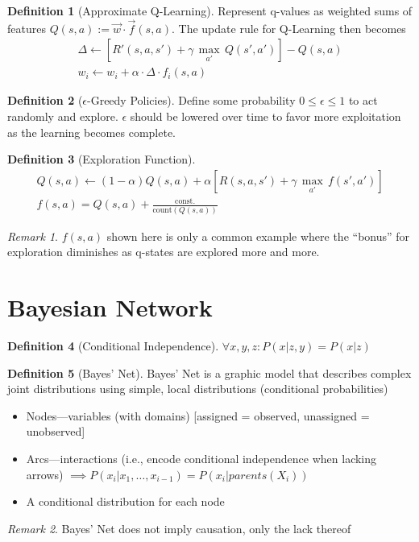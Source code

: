 \documentclass[11pt]{article}
\theoremstyle{definition}
\newtheorem{definition}{Definition}[section]
\theoremstyle{remark}
\newtheorem*{remark}{Remark}
\begin{document}
\begin{definition}[Approximate Q-Learning] Represent q-values as weighted sums of features $Q(s,a) := \vec{w} \cdot \vec{f}(s,a)$. The update rule for Q-Learning then becomes
\begin{align*}
\Delta \gets [R'(s,a,s')+\gamma \, \underset{a'}{\max}\,Q(s',a')]-Q(s,a) \\
w_i \gets w_i + \alpha \cdot \Delta \cdot f_i(s,a)
\end{align*}
\end{definition}

\begin{definition}[$\epsilon$-Greedy Policies]
Define some probability $0\leq \epsilon \leq 1$ to act randomly and explore. $\epsilon$ should be lowered over time to favor more exploitation as the learning becomes complete.
\end{definition}

\begin{definition}[Exploration Function]
\begin{align*}
Q(s,a) \gets (1-\alpha)Q(s,a) + \alpha [R(s,a,s')+\gamma \, \underset{a'}{\max}\,f(s',a')] \\
f(s,a) = Q(s,a)+\tfrac{\text{const.}}{\text{count}(Q(s,a))}
\end{align*}
\end{definition}

\begin{remark}
$f(s,a)$ shown here is only a common example where the ``bonus'' for exploration diminishes as q-states are explored more and more.
\end{remark}
\clearpage

\section{Bayesian Network}
\begin{definition}[Conditional Independence]
$\forall x,y,z : P(x|z,y)=P(x|z)$
\end{definition}

\begin{definition}[Bayes' Net] Bayes' Net is a graphic model that describes complex joint distributions using simple, local distributions (conditional probabilities)
\begin{itemize}
\item Nodes---variables (with domains) [assigned = observed, unassigned = unobserved]
\item Arcs---interactions (i.e., encode conditional independence when lacking arrows) $\implies P(x_i|x_1,\dots,x_{i-1})=P(x_i|parents(X_i))$
\item A conditional distribution for each node
\end{itemize}
\end{definition}
\begin{remark}
Bayes' Net does not imply causation, only the lack thereof
\end{remark}
\end{document}
